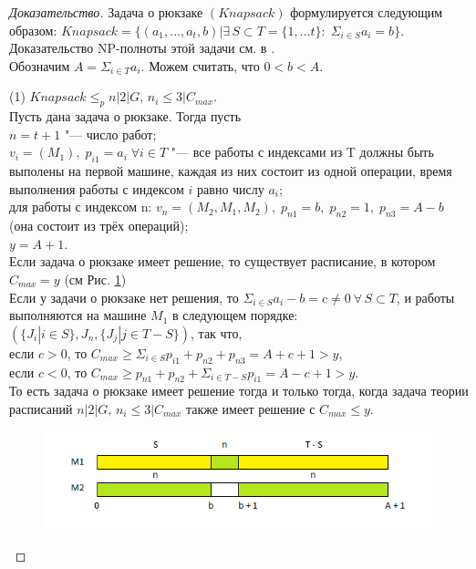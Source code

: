 \documentclass[a4paper,12pt]{article}
\theoremstyle{plain} %
\theoremstyle{definition} %
\theoremstyle{remark} %
\begin{document}
\begin{proof}[Доказательство]
	Задача о рюкзаке $(Knapsack)$ формулируется следующим образом: 
	$Knapsack = \{(a_1, ..., a_t, b)| \exists \, S \subset T=\{1,...t\}: \; \Sigma_{i \in S}a_i = b\}$. Доказательство NP-полноты этой задачи см. в \cite{karp}.\\
	Обозначим $A = \Sigma_{i \in T}a_i$. Можем считать, что $0 < b < A$.
	
	\par\bigskip
	(1) $Knapsack \le_p n|2|G, \, n_i \le 3|C_{max}$.\\
	Пусть дана задача о рюкзаке. Тогда пусть\\
	$n = t + 1$ "--- число работ;\\
	$v_i = (M_1), \; p_{i1} = a_i \; \forall i \in T$ "--- все работы с индексами из T должны быть выполены на первой машине, каждая из них состоит из одной операции, время выполнения работы с индексом $i$ равно числу $a_i$;\\
	для работы с индексом n: $v_n = (M_2, M_1, M_2), \; p_{n1} = b, \; p_{n2} = 1, \; p_{n3} = A - b$ (она состоит из трёх операций);\\
	$y = A + 1$.\\
	Если задача о рюкзаке имеет решение, то существует расписание, в котором $C_{max} = y$ (см Рис. \ref{fig_1})\\
	Если у задачи о рюкзаке нет решения, то $\Sigma_{i \in S}a_i - b = c \ne 0 \: \forall \, S \subset T$, и работы выполняются на машине $M_1$ в следующем порядке: $(\{J_i| i \in S\}, J_n, \{J_j| j \in T-S\})$, так что,\\
	если $c > 0$, то $C_{max} \ge \Sigma_{i \in S}p_{i1} + p_{n2} + p_{n3} = A + c + 1 > y$,\\
	если $c < 0$, то $C_{max} \ge p_{n1} + p_{n2} + \Sigma_{i \in T-S}p_{i1} = A - c + 1 > y$.\\
	То есть задача о рюкзаке имеет решение тогда и только тогда, когда задача теории расписаний $n|2|G, \, n_i \le 3|C_{max}$ также имеет решение с $C_{max} \le y$.
	\begin{figure}[h!]
		\begin{center}
			\includegraphics[scale=0.65]{pic_1.png}
			\caption[]{}
			\label{fig_1}
		\end{center}
	\end{figure}
	

\end{proof}
\end{document}
